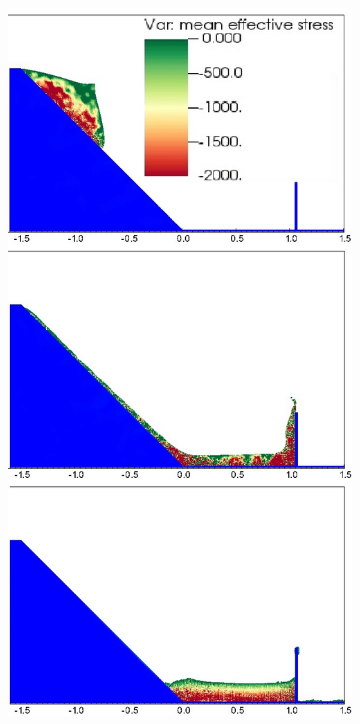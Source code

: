 \documentclass[preprint,12pt]{elsarticle}
\begin{document}
\begin{figure}[]
\center
\begin{subfigure}[c]{0.5\linewidth}
\includegraphics[width=\linewidth]{SHMPM.jpg}

\end{subfigure}
\end{figure}
\end{document}
